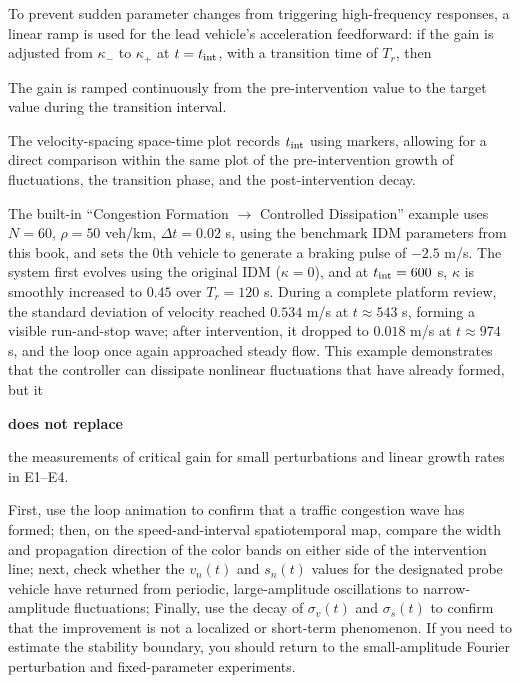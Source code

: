 \documentclass[11pt,a4paper,openany]{book}
\numberwithin{equation}{chapter}
\numberwithin{figure}{chapter}
\numberwithin{table}{chapter}
\begin{document}
To prevent sudden parameter changes from triggering high-frequency responses, a linear ramp is used for the lead vehicle’s acceleration feedforward: if the gain is adjusted from $\kappa_-$ to $\kappa_+$ at $t=t_{\rm int}$, with a transition time of $T_r$, then

The gain is ramped continuously from the pre-intervention value to the target value during the transition interval.


The velocity-spacing space-time plot records $t_{\rm int}$ using markers, allowing for a direct comparison within the same plot of the pre-intervention growth of fluctuations, the transition phase, and the post-intervention decay.




The built-in “Congestion Formation $\rightarrow$ Controlled Dissipation” example uses $N=60$, $\rho=50$ veh/km, $\Delta t=0.02$ s, using the benchmark IDM parameters from this book, and sets the 0th vehicle to generate a braking pulse of $-2.5$ m/s. The system first evolves using the original IDM ($\kappa=0$), and at $t_{\rm int}=600$ s, $\kappa$ is smoothly increased to $0.45$ over $T_r=120$ s. During a complete platform review, the standard deviation of velocity reached $0.534$ m/s at $t\approx543$ s, forming a visible run-and-stop wave; after intervention, it dropped to $0.018$ m/s at $t\approx974$ s, and the loop once again approached steady flow. This example demonstrates that the controller can dissipate nonlinear fluctuations that have already formed, but it




\textbf{does not replace}




the measurements of critical gain for small perturbations and linear growth rates in E1–E4.










\begin{tcolorbox}[experimentbox,title=\textbf{Sequence for Interpreting Online Interventions}]

First, use the loop animation to confirm that a traffic congestion wave has formed; then, on the speed-and-interval spatiotemporal map, compare the width and propagation direction of the color bands on either side of the intervention line; next, check whether the $v_n(t)$ and $s_n(t)$ values for the designated probe vehicle have returned from periodic, large-amplitude oscillations to narrow-amplitude fluctuations; Finally, use the decay of $\sigma_v(t)$ and $\sigma_s(t)$ to confirm that the improvement is not a localized or short-term phenomenon. If you need to estimate the stability boundary, you should return to the small-amplitude Fourier perturbation and fixed-parameter experiments.







\end{tcolorbox}
\end{document}
